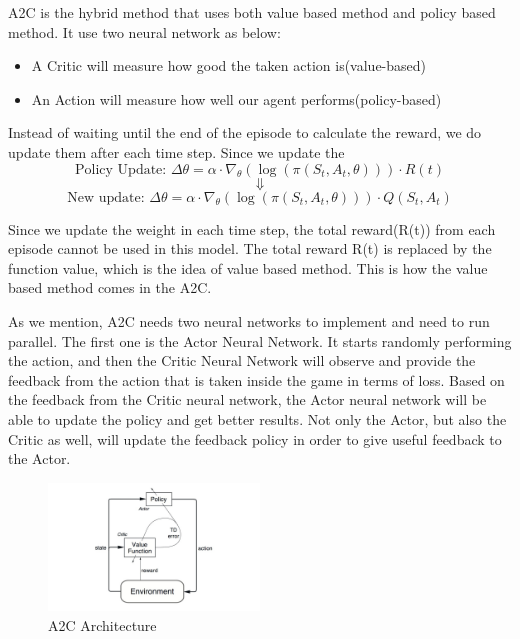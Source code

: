 \documentclass{article}
\begin{document}
A2C is the hybrid method that uses both value based method and policy based method. It use two neural network as below:
\begin{itemize}
\item A Critic will measure how good the taken action is(value-based)
\item An Action will measure how well our agent performs(policy-based)
\end{itemize}

Instead of waiting until the end of the episode to calculate the reward, we do update them after each time step. Since we update the 
$$\text{Policy Update: } \Delta \theta = \alpha \cdot \nabla_{\theta} (\log(\pi (S_t, A_t, \theta))) \cdot R(t)$$
$$\Downarrow$$
$$\text{New update: } \Delta \theta = \alpha \cdot \nabla_{\theta} (\log(\pi (S_t, A_t, \theta))) \cdot Q(S_t, A_t)$$

Since we update the weight in each time step, the total reward(R(t)) from each episode cannot be used in this model. The total reward R(t) is replaced by the function value, which is the idea of value based method. This is how the value based method comes in the A2C. \par 

As we mention, A2C needs two neural networks to implement and need to run parallel. The first one is the Actor Neural Network. It starts randomly performing the action, and then the Critic Neural Network will observe and provide the feedback from the action that is taken inside the game in terms of loss. Based on the feedback from the Critic neural network, the Actor neural network will be able to update the policy and get better results. Not only the Actor, but also the Critic as well, will update the feedback policy in order to give useful feedback to the Actor. \par

\begin{figure}[H]
    \caption{A2C Architecture}
    \centering
    \includegraphics[width=0.5\textwidth]{A2C_Arch.png}
\end{figure}
\end{document}
